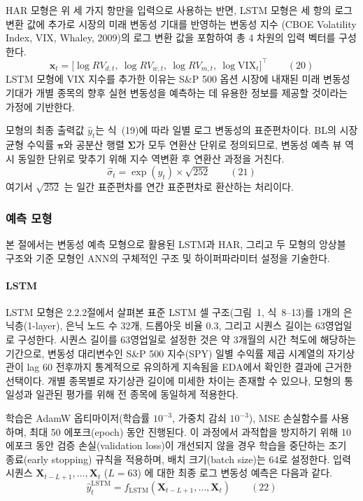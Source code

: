 \documentclass{article}
\begin{document}
HAR 모형은 위 세 가지 항만을 입력으로 사용하는 반면, LSTM 모형은 세 항의 로그 변환 값에 추가로 시장의 미래 변동성 기대를 반영하는 변동성 지수 (CBOE Volatility Index, VIX, Whaley, 2009)의 로그 변환 값을 포함하여 총 4 차원의 입력 벡터를 구성한다.
\begin{equation}
\mathbf{x}_t = \bigl[\log RV_{d,t},\ \log RV_{w,t},\ \log RV_{m,t},\
\log \text{VIX}_t\bigr]^\top \qquad(20)\end{equation}
LSTM 모형에 VIX 지수를 추가한 이유는 S\&P 500 옵션 시장에 내재된 미래 변동성 기대가 개별 종목의 향후 실현 변동성을 예측하는 데 유용한 정보를 제공할 것이라는 가정에 기반한다.

모형의 최종 출력값 $\hat{y}_t$는 식~(19)에 따라 일별 로그 변동성의 표준편차이다. BL의 시장 균형 수익률 $\boldsymbol{\pi}$와 공분산 행렬 $\boldsymbol{\Sigma}$가 모두 연환산 단위로 정의되므로, 변동성 예측 뷰 역시 동일한 단위로 맞추기 위해 지수 역변환 후 연환산 과정을 거친다.
\begin{equation}
\hat{\sigma}_t = \exp(\hat{y}_t) \times \sqrt{252} \qquad(21)\end{equation}
여기서 $\sqrt{252}$ 는 일간 표준편차를 연간 표준편차로 환산하는 처리이다.

\subsubsection{예측 모형}

본 절에서는 변동성 예측 모형으로 활용된 LSTM과 HAR, 그리고 두 모형의 앙상블 구조와 기준 모형인 ANN의 구체적인 구조 및 하이퍼파라미터 설정을 기술한다.

\paragraph{LSTM}
LSTM 모형은 2.2.2절에서 살펴본 표준 LSTM 셀 구조(그림~1, 식~8--13)를 1개의 은닉층(1-layer), 은닉 노드 수 32개, 드롭아웃 비율 0.3, 그리고 시퀀스 길이는 63영업일로 구성한다. 시퀀스 길이를 63영업일로 설정한 것은 약 3개월의 시간 척도에 해당하는 기간으로, 변동성 대리변수인 S\&P 500 지수(SPY) 일별 수익률 제곱 시계열의 자기상관이 lag 60 전후까지 통계적으로 유의하게 지속됨을 EDA에서 확인한 결과에 근거한 선택이다. 개별 종목별로 자기상관 길이에 미세한 차이는 존재할 수 있으나, 모형의 통일성과 일관된 평가를 위해 전 종목에 동일하게 적용한다.

학습은 AdamW 옵티마이저(학습률 $10^{-3}$, 가중치 감쇠 $10^{-3}$), MSE 손실함수를 사용하며, 최대 50 에포크(epoch) 동안 진행된다. 이 과정에서 과적합을 방지하기 위해 10 에포크 동안 검증 손실(validation loss)이 개선되지 않을 경우 학습을 중단하는 조기 종료(early stopping) 규칙을 적용하며, 배치 크기(batch size)는 64로 설정한다. 입력 시퀀스 $\mathbf{X}_{t-L+1}, \ldots, \mathbf{X}_t$ ($L=63$) 에 대한 최종 로그 변동성 예측은 다음과 같다.
\begin{equation}
\hat{y}^{\text{LSTM}}_t = f_{\text{LSTM}}(\mathbf{X}_{t-L+1}, \ldots,
\mathbf{X}_t) \qquad(22)\end{equation}
\end{document}
